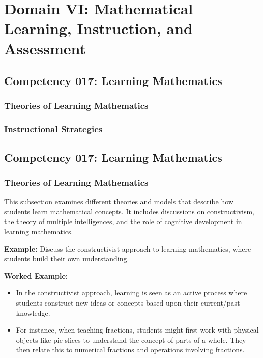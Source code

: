 \documentclass{book}
\begin{document}
\chapter{Domain VI: Mathematical Learning, Instruction, and Assessment}

\section{Competency 017: Learning Mathematics}
\subsection{Theories of Learning Mathematics}
\subsection{Instructional Strategies}

\section{Competency 017: Learning Mathematics}


\subsection{Theories of Learning Mathematics}
This subsection examines different theories and models that describe how students learn mathematical concepts. It includes discussions on constructivism, the theory of multiple intelligences, and the role of cognitive development in learning mathematics.


\textbf{Example:} Discuss the constructivist approach to learning mathematics, where students build their own understanding.


\textbf{Worked Example:}
\begin{itemize}
        \item In the constructivist approach, learning is seen as an active process where students construct new ideas or concepts based upon their current/past knowledge.
        \item For instance, when teaching fractions, students might first work with physical objects like pie slices to understand the concept of parts of a whole. They then relate this to numerical fractions and operations involving fractions.
\end{itemize}
\end{document}
